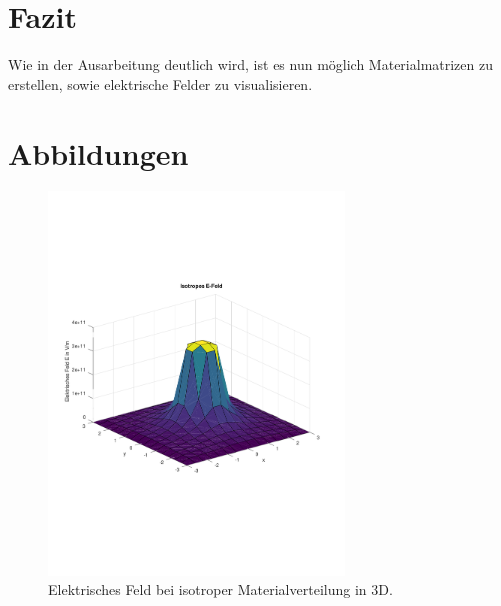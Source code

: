 \documentclass[Protokollheft.tex]{subfiles}
\begin{document}
\section{Fazit}
Wie in der Ausarbeitung deutlich wird, ist es nun möglich Materialmatrizen zu erstellen, sowie elektrische Felder zu visualisieren.

\section{Abbildungen}
\begin{figure}[h!]
	\centering
	\includegraphics[trim = 10mm 60mm 10mm 50mm, clip, width=0.7\textwidth]{efield_1.pdf}
	\caption{Elektrisches Feld bei isotroper Materialverteilung in 3D.}
	\label{Abb:61}
\end{figure}
\end{document}
